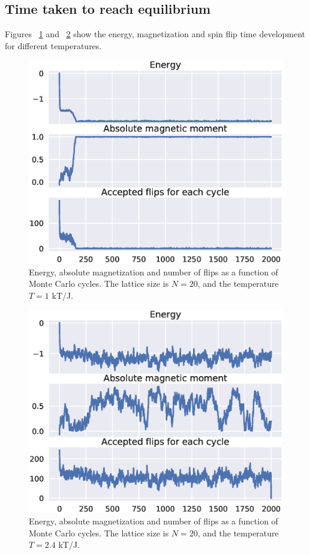 \documentclass[aps,reprint]{revtex4-1}
\begin{document}
\subsection{Time taken to reach equilibrium}
Figures ~\ref{fig:L20T1Random} and ~\ref{fig:L20T24Random} show the energy,
magnetization and spin flip time development for different temperatures.
\begin{figure}
  \includegraphics[width=\columnwidth]{figures/L20T1_random.eps}
  \caption{Energy, absolute magnetization and number of flips as a function of
  Monte Carlo cycles. The lattice size is $N = 20$, and the temperature $T = 1$ kT/J.}
  \label{fig:L20T1Random}
\end{figure}
\begin{figure}
  \includegraphics[width=\columnwidth]{figures/L20T2_4_random.eps}
  \caption{Energy, absolute magnetization and number of flips as a function of
  Monte Carlo cycles. The lattice size is $N = 20$, and the temperature $T = 2.4$ kT/J.}
  \label{fig:L20T24Random}
\end{figure}
\end{document}
